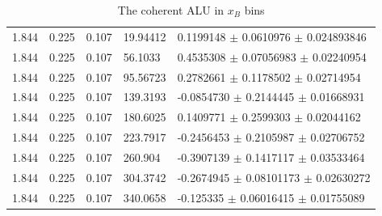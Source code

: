 \begin{table}[!h]
\begin{center}
\begin{tabular}{||l|l|l|l|l||}
        1.844 & 0.225 & 0.107 &   19.94412   &    0.1199148  $\pm$   0.0610976     $\pm$   0.024893846   \\
        1.844 & 0.225 & 0.107 &   56.1033    &    0.4535308  $\pm$   0.07056983    $\pm$   0.02240954    \\
        1.844 & 0.225 & 0.107 &   95.56723   &    0.2782661  $\pm$   0.1178502     $\pm$   0.02714954    \\
        1.844 & 0.225 & 0.107 &   139.3193   &   -0.0854730  $\pm$   0.2144445     $\pm$   0.01668931    \\
        1.844 & 0.225 & 0.107 &   180.6025   &    0.1409771  $\pm$   0.2599303     $\pm$   0.02044162    \\
        1.844 & 0.225 & 0.107 &   223.7917   &   -0.2456453  $\pm$   0.2105987     $\pm$   0.02706752    \\
        1.844 & 0.225 & 0.107 &   260.904    &   -0.3907139  $\pm$   0.1417117     $\pm$   0.03533464    \\
        1.844 & 0.225 & 0.107 &   304.3742   &   -0.2674945  $\pm$   0.08101173    $\pm$   0.02630272    \\
        1.844 & 0.225 & 0.107 &   340.0658   &   -0.125335   $\pm$   0.06016415    $\pm$   0.01755089    \\
         \hline  
         \hline
      \end{tabular}
      \caption{The coherent ALU in $x_B$ bins}
      \label{table:Coh_xB_BSA}
   \end{center}
\end{table}                        

